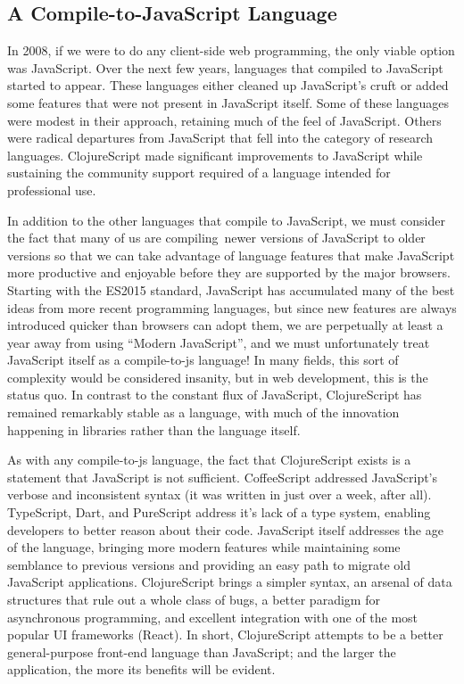 \documentclass[10pt,twoside,openright]{memoir}
\begin{document}
\subsection{A Compile-to-JavaScript Language}

In 2008, if we were to do any client-side web programming, the only
viable option was JavaScript. Over the next few years, languages that
compiled to JavaScript started to appear. These languages either cleaned
up JavaScript's cruft or added some features that were not present in
JavaScript itself. Some of these languages were modest in their
approach, retaining much of the feel of JavaScript. Others were radical
departures from JavaScript that fell into the category of research
languages. ClojureScript made significant improvements to JavaScript
while sustaining the community support required of a language intended
for professional use. 

In addition to the other languages that compile to JavaScript, we must
consider the fact that many of us are compiling~newer versions of
JavaScript to older versions so that we can take advantage of language
features that make JavaScript more productive and enjoyable before they
are supported by the major browsers. Starting with the ES2015 standard,
JavaScript has accumulated many of the best ideas from more recent
programming languages, but since new features are always introduced
quicker than browsers can adopt them, we are perpetually at least a year
away from using ``Modern JavaScript'', and we must unfortunately treat
JavaScript itself as a compile-to-js language! In many fields, this sort
of complexity would be considered insanity, but in web development, this
is the status quo. In contrast to the constant flux of JavaScript,
ClojureScript has remained remarkably stable as a language, with much of
the innovation happening in libraries rather than the language itself.

As with any compile-to-js language, the fact that ClojureScript exists
is a statement that JavaScript is not sufficient. CoffeeScript addressed
JavaScript's verbose and inconsistent syntax (it was written in just
over a week, after all). TypeScript, Dart, and PureScript address it's
lack of a type system, enabling developers to better reason about their
code. JavaScript itself addresses the age of the language, bringing more
modern features while maintaining some semblance to previous versions
and providing an easy path to migrate old JavaScript applications.
ClojureScript brings a simpler syntax, an arsenal of data structures
that rule out a whole class of bugs, a better paradigm for asynchronous
programming, and excellent integration with one of the most popular UI
frameworks (React). In short, ClojureScript attempts to be a better
general-purpose front-end language than JavaScript; and the larger the
application, the more its benefits will be evident.
\end{document}

